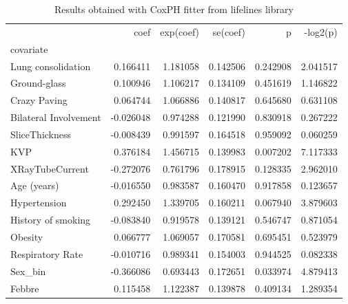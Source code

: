 \begin{table}
\centering
\caption{Results obtained with CoxPH fitter from lifelines library\label{tab:CoxResult}}
\begin{adjustbox}{width=\linewidth}
\begin{tabular}{|lrrrrr|}
\toprule
{} &      coef &  exp(coef) &  se(coef) &           p &  -log2(p) \\
covariate                               &           &            &           &                 &               \\
\midrule
Lung consolidation                     			&  0.166411 &   1.181058 &  0.142506 &        0.242908 &  2.041517 \\
Ground-glass                            			&  0.100946 &   1.106217 &  0.134109 &        0.451619 &  1.146822 \\
Crazy Paving                             			&  0.064744 &   1.066886 &  0.140817 &        0.645680 &  0.631108 \\
Bilateral Involvement                  			& -0.026048 &   0.974288 &  0.121990 &        0.830918 &  0.267222 \\
SliceThickness                          			& -0.008439 &   0.991597 &  0.164518 &        0.959092 &  0.060259 \\
KVP                                        			&  0.376184 &   1.456715 &  0.139983 &        0.007202 &  7.117333 \\
XRayTubeCurrent                     			& -0.272076 &   0.761796 &  0.178915 &        0.128335 &  2.962010 \\
Age (years)                              			& -0.016550 &   0.983587 &  0.160470 &        0.917858 &  0.123657 \\
Hypertension                            			&  0.292450 &   1.339705 &  0.160211 &        0.067940 &  3.879603 \\
History of smoking                    			& -0.083840 &   0.919578 &  0.139121 &         0.546747 &  0.871054 \\
Obesity                                    			&  0.066777 &   1.069057 &  0.170581 &         0.695451 &  0.523979 \\
Respiratory Rate                      			& -0.010716 &   0.989341 &  0.154003 &         0.944525 &  0.082338 \\
Sex\_bin                                 			& -0.366086 &   0.693443 &  0.172651 &         0.033974 &  4.879413 \\
Febbre                                     		  	&  0.115458 &   1.122387 &  0.139878 &         0.409134 &  1.289354 \\

\end{tabular}
\end{adjustbox}
\end{table}
